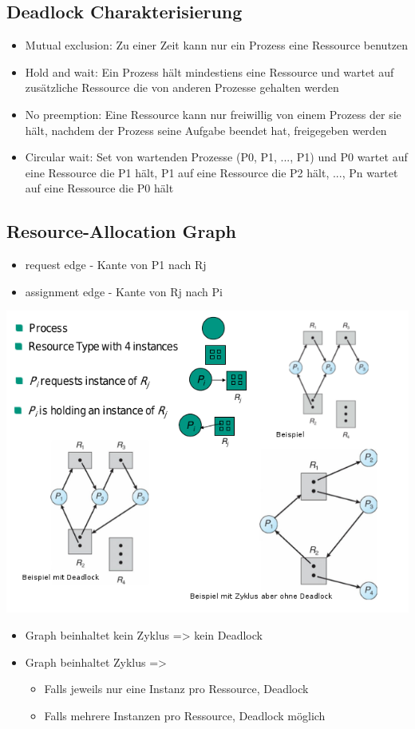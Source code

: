 \documentclass[a4paper]{scrreprt}
\begin{document}
		\subsection{Deadlock Charakterisierung}
			\begin{itemize}
				\item Mutual exclusion: Zu einer Zeit kann nur ein Prozess eine Ressource benutzen
				\item Hold and wait: Ein Prozess hält mindestiens eine Ressource und wartet auf zusätzliche Ressource die von anderen Prozesse gehalten werden
				\item No preemption: Eine Ressource kann nur freiwillig von einem Prozess der sie hält, nachdem der Prozess seine Aufgabe beendet hat, freigegeben werden
				\item Circular wait: Set von wartenden Prozesse (P0, P1, ..., P1) und P0 wartet auf eine Ressource die P1 hält, P1 auf eine Ressource die P2 hält, ..., Pn wartet auf eine Ressource die P0 hält
			\end{itemize}
		\subsection{Resource-Allocation Graph}
			\begin{itemize}
				\item request edge - Kante von P1 nach Rj
				\item assignment edge - Kante von Rj nach Pi
			\end{itemize}
		\includegraphics[scale=0.7]{graphics/resallograph.png}
			\begin{itemize}
				\item Graph beinhaltet kein Zyklus => kein Deadlock
				\item Graph beinhaltet Zyklus =>
					\begin{itemize}
						\item Falls jeweils nur eine Instanz pro Ressource, Deadlock
						\item Falls mehrere Instanzen pro Ressource, Deadlock möglich
					\end{itemize}
			\end{itemize}
\end{document}
